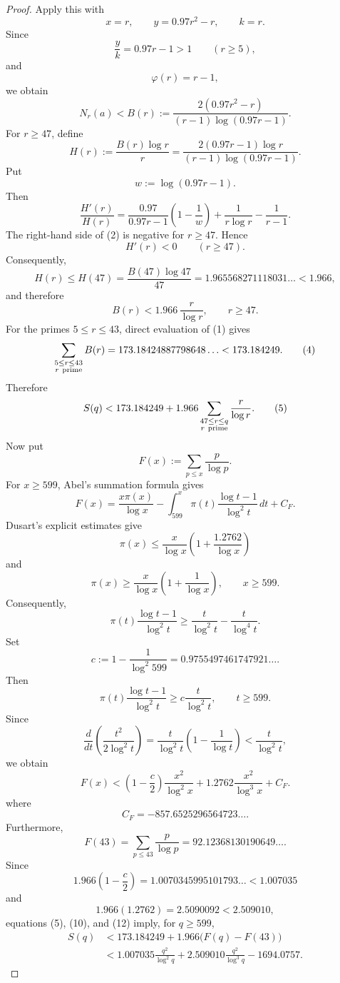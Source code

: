 \documentclass[11pt,a4paper]{article}
\theoremstyle{definition}
\theoremstyle{remark}
\begin{document}
\begin{proof}
Apply this with
\[
x=r,\qquad
y=0.97r^2-r,\qquad
k=r.
\]
Since
\[
\frac{y}{k}
=
0.97r-1>1
\qquad(r\ge5),
\]
and
\[
\varphi(r)=r-1,
\]
we obtain
\[
N_r(a)
<
B(r):=
\frac{2(0.97r^2-r)}
{(r-1)\log(0.97r-1)}.
\tag{1}
\]
For $r\ge47$, define
\[
H(r):=
\frac{B(r)\log r}{r}
=
\frac{2(0.97r-1)\log r}
{(r-1)\log(0.97r-1)}.
\]
Put
\[
w:=\log(0.97r-1).
\]
Then
\[
\frac{H'(r)}{H(r)}
=
\frac{0.97}{0.97r-1}
\left(1-\frac1w\right)
+\frac1{r\log r}
-\frac1{r-1}.
\tag{2}
\]
The right-hand side of (2) is negative for $r\ge47$. Hence
\[
H'(r)<0
\qquad(r\ge47).
\]
Consequently,
\[
H(r)\le H(47)
=
\frac{B(47)\log47}{47}
=
1.965568271118031\ldots
<
1.966,
\]
and therefore
\[
B(r)<1.966\,\frac r{\log r},
\qquad r\ge47.
\tag{3}
\]
For the primes $5\le r\le43$, direct evaluation of (1) gives
\[
\sum_{\substack{5\le r\le43\\r\ {\rm prime}}}B(r)
=
173.18424887798648\ldots
<
173.184249.
\tag{4}
\]
Therefore
\[
S(q)
<
173.184249
+
1.966
\sum_{\substack{47\le r\le q\\r\ {\rm prime}}}
\frac r{\log r}.
\tag{5}
\]
Now put
\[
F(x):=\sum_{p\le x}\frac p{\log p}.
\]
For $x\ge599$, Abel's summation formula \cite{apostol1976analytic} gives
\[
F(x)
=
\frac{x\pi(x)}{\log x}
-\int_{599}^x
\pi(t)\frac{\log t-1}{\log^2t}\,dt
+C_F.
\tag{6}
\]
Dusart's explicit estimates \cite{dusart2010} give
\[
\pi(x)
\le
\frac{x}{\log x}
\left(1+\frac{1.2762}{\log x}\right)
\tag{7}
\]
and
\[
\pi(x)
\ge
\frac{x}{\log x}
\left(1+\frac1{\log x}\right),
\qquad x\ge599.
\tag{8}
\]
Consequently,
\[
\pi(t)\frac{\log t-1}{\log^2t}
\ge
\frac{t}{\log^2t}
-\frac{t}{\log^4t}.
\]
Set
\[
c:=
1-\frac1{\log^2 599}
=
0.9755497461747921\ldots.
\]
Then
\[
\pi(t)\frac{\log t-1}{\log^2t}
\ge
c\frac{t}{\log^2t},
\qquad t\ge599.
\tag{9}
\]
Since
\[
\frac{d}{dt}
\left(
\frac{t^2}{2\log^2t}
\right)
=
\frac{t}{\log^2t}
\left(1-\frac1{\log t}\right)
<
\frac{t}{\log^2t},
\]
we obtain
\[
F(x)
<
\left(1-\frac c2\right)
\frac{x^2}{\log^2x}
+
1.2762\frac{x^2}{\log^3x}
+
C_F.
\tag{10}
\]
where
\[
C_F
=
-857.6525296564723\ldots.
\tag{11}
\]
Furthermore,
\[
F(43)
=
\sum_{p\le43}\frac p{\log p}
=
92.12368130190649\ldots.
\tag{12}
\]
Since
\[
1.966\left(1-\frac c2\right)
=
1.0070345995101793\ldots
<
1.007035
\]
and
\[
1.966(1.2762)
=
2.5090092
<
2.509010,
\]
equations (5), (10), and (12) imply, for $q\ge599$,
\[
\begin{aligned}
S(q)
&<
173.184249
+
1.966\bigl(F(q)-F(43)\bigr)
\\
&<
1.007035\frac{q^2}{\log^2q}
+
2.509010\frac{q^2}{\log^3q}
-1694.0757.
\end{aligned}
\tag{13}
\]


\end{proof}
\end{document}

